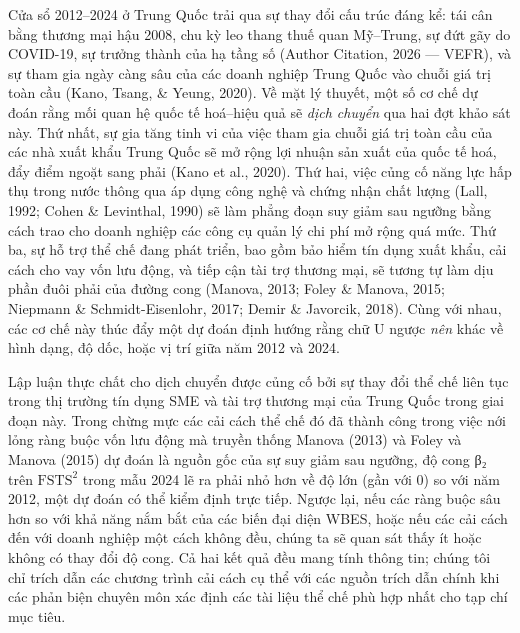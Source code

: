 \documentclass[12pt,a4paper]{article}
\begin{document}
Cửa sổ 2012--2024 ở Trung Quốc trải qua sự thay đổi cấu trúc đáng kể:
tái cân bằng thương mại hậu 2008, chu kỳ leo thang thuế quan Mỹ--Trung,
sự đứt gãy do COVID-19, sự trưởng thành của hạ tầng số (Author Citation,
2026 --- VEFR), và sự tham gia ngày càng sâu của các doanh nghiệp Trung
Quốc vào chuỗi giá trị toàn cầu (Kano, Tsang, \& Yeung, 2020). Về mặt lý
thuyết, một số cơ chế dự đoán rằng mối quan hệ quốc tế hoá--hiệu quả sẽ
\emph{dịch chuyển} qua hai đợt khảo sát này. Thứ nhất, sự gia tăng tinh
vi của việc tham gia chuỗi giá trị toàn cầu của các nhà xuất khẩu Trung
Quốc sẽ mở rộng lợi nhuận sản xuất của quốc tế hoá, đẩy điểm ngoặt sang
phải (Kano et al., 2020). Thứ hai, việc củng cố năng lực hấp thụ trong
nước thông qua áp dụng công nghệ và chứng nhận chất lượng (Lall, 1992;
Cohen \& Levinthal, 1990) sẽ làm phẳng đoạn suy giảm sau ngưỡng bằng
cách trao cho doanh nghiệp các công cụ quản lý chi phí mở rộng quá mức.
Thứ ba, sự hỗ trợ thể chế đang phát triển, bao gồm bảo hiểm tín dụng
xuất khẩu, cải cách cho vay vốn lưu động, và tiếp cận tài trợ thương
mại, sẽ tương tự làm dịu phần đuôi phải của đường cong (Manova, 2013;
Foley \& Manova, 2015; Niepmann \& Schmidt-Eisenlohr, 2017; Demir \&
Javorcik, 2018). Cùng với nhau, các cơ chế này thúc đẩy một dự đoán định
hướng rằng chữ U ngược \emph{nên} khác về hình dạng, độ dốc, hoặc vị trí
giữa năm 2012 và 2024.

Lập luận thực chất cho dịch chuyển được củng cố bởi sự thay đổi thể chế
liên tục trong thị trường tín dụng SME và tài trợ thương mại của Trung
Quốc trong giai đoạn này. Trong chừng mực các cải cách thể chế đó đã
thành công trong việc nới lỏng ràng buộc vốn lưu động mà truyền thống
Manova (2013) và Foley và Manova (2015) dự đoán là nguồn gốc của sự suy
giảm sau ngưỡng, độ cong β₂ trên \(\mathrm{FSTS}^2\) trong mẫu 2024 lẽ
ra phải nhỏ hơn về độ lớn (gần với 0) so với năm 2012, một dự đoán có
thể kiểm định trực tiếp. Ngược lại, nếu các ràng buộc sâu hơn so với khả
năng nắm bắt của các biến đại diện WBES, hoặc nếu các cải cách đến với
doanh nghiệp một cách không đều, chúng ta sẽ quan sát thấy ít hoặc không
có thay đổi độ cong. Cả hai kết quả đều mang tính thông tin; chúng tôi
chỉ trích dẫn các chương trình cải cách cụ thể với các nguồn trích dẫn
chính khi các phản biện chuyên môn xác định các tài liệu thể chế phù hợp
nhất cho tạp chí mục tiêu.
\end{document}
